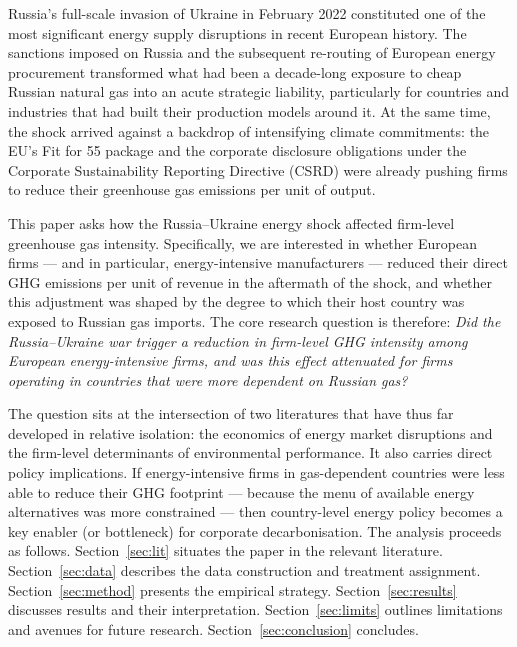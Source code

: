 \documentclass[authoryear,preprint,review,12pt]{elsarticle}
\begin{document}
Russia's full-scale invasion of Ukraine in February 2022 constituted one of the most significant energy supply disruptions in recent European history. The sanctions imposed on Russia and the subsequent re-routing of European energy procurement transformed what had been a decade-long exposure to cheap Russian natural gas into an acute strategic liability, particularly for countries and industries that had built their production models around it. At the same time, the shock arrived against a backdrop of intensifying climate commitments: the EU's Fit for 55 package and the corporate disclosure obligations under the Corporate Sustainability Reporting Directive (CSRD) were already pushing firms to reduce their greenhouse gas emissions per unit of output.

This paper asks how the Russia--Ukraine energy shock affected firm-level greenhouse gas intensity. Specifically, we are interested in whether European firms --- and in particular, energy-intensive manufacturers --- reduced their direct GHG emissions per unit of revenue in the aftermath of the shock, and whether this adjustment was shaped by the degree to which their host country was exposed to Russian gas imports. The core research question is therefore: \textit{Did the Russia--Ukraine war trigger a reduction in firm-level GHG intensity among European energy-intensive firms, and was this effect attenuated for firms operating in countries that were more dependent on Russian gas?}

The question sits at the intersection of two literatures that have thus far developed in relative isolation: the economics of energy market disruptions and the firm-level determinants of environmental performance. It also carries direct policy implications. If energy-intensive firms in gas-dependent countries were less able to reduce their GHG footprint --- because the menu of available energy alternatives was more constrained --- then country-level energy policy becomes a key enabler (or bottleneck) for corporate decarbonisation. The analysis proceeds as follows. Section~\ref{sec:lit} situates the paper in the relevant literature. Section~\ref{sec:data} describes the data construction and treatment assignment. Section~\ref{sec:method} presents the empirical strategy. Section~\ref{sec:results} discusses results and their interpretation. Section~\ref{sec:limits} outlines limitations and avenues for future research. Section~\ref{sec:conclusion} concludes.


\end{document}

